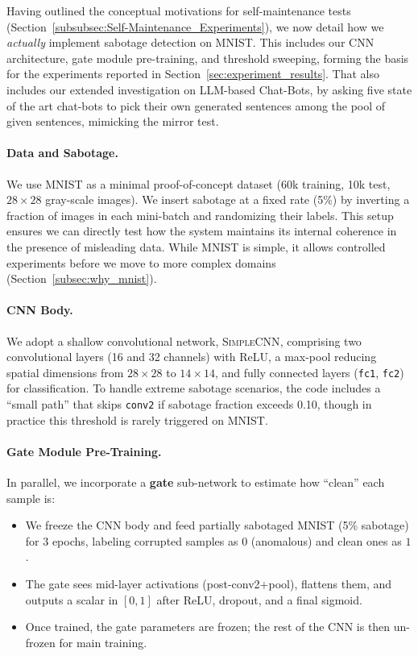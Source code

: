 \documentclass[12pt]{article}
\begin{document}
Having outlined the conceptual motivations for self-maintenance tests
(Section~\ref{subsubsec:Self-Maintenance_Experiments}), we now detail how we \emph{actually}
implement sabotage detection on MNIST. This includes our CNN architecture, gate module
pre-training, and threshold sweeping, forming the basis for the experiments reported
in Section~\ref{sec:experiment_results}. That also includes our extended investigation on LLM-based Chat-Bots, by asking five state of the art chat-bots to pick their own generated sentences among the pool of given sentences, mimicking the mirror test.

\paragraph{Data and Sabotage.}
We use MNIST as a minimal proof-of-concept dataset (60k training, 10k test, $28\times28$
gray-scale images). We insert sabotage at a fixed rate (5\%) by inverting a fraction of
images in each mini-batch and randomizing their labels. This setup ensures we can
directly test how the system maintains its internal coherence in the presence of
misleading data. While MNIST is simple, it allows controlled experiments before we
move to more complex domains (Section~\ref{subsec:why_mnist}).

\paragraph{CNN Body.}
We adopt a shallow convolutional network, \textsc{SimpleCNN}, comprising two
convolutional layers (16 and 32 channels) with ReLU, a max-pool reducing spatial
dimensions from $28\times28$ to $14\times14$, and fully connected layers
(\texttt{fc1}, \texttt{fc2}) for classification. To handle extreme sabotage scenarios,
the code includes a ``small path'' that skips \texttt{conv2} if sabotage fraction
exceeds 0.10, though in practice this threshold is rarely triggered on MNIST.

\paragraph{Gate Module Pre-Training.}
In parallel, we incorporate a \textbf{gate} sub-network to estimate how ``clean''
each sample is:
\begin{itemize}
  \item We freeze the CNN body and feed partially sabotaged MNIST (5\% sabotage) for
        3 epochs, labeling corrupted samples as $0$ (anomalous) and clean ones as $1$.
  \item The gate sees mid-layer activations (post-conv2+pool), flattens them, and
        outputs a scalar in $[0,1]$ after ReLU, dropout, and a final sigmoid.
  \item Once trained, the gate parameters are frozen; the rest of the CNN is then
        un-frozen for main training.
\end{itemize}
\end{document}
